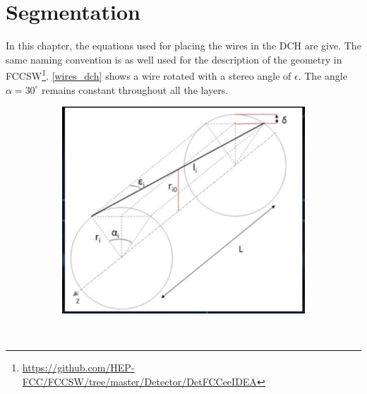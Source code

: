 \appendix
\section{Segmentation}\label{sec_segmentation_app}

In this chapter, the equations used for placing the wires in the DCH are give. The same naming convention is as well used for the description of the geometry in FCCSW\footnote{\href{https://github.com/HEP-FCC/FCCSW/tree/master/Detector/DetFCCeeIDEA}{https://github.com/HEP-FCC/FCCSW/tree/master/Detector/DetFCCeeIDEA}}. \cref{wires_dch} shows a wire rotated with a stereo angle of $\epsilon$. The angle $\alpha = 30^{\circ}$ remains constant throughout all the layers.


\begin{figure}[ht]
  \begin{subfigure}[b]{0.49\textwidth}
	   \centering
	   \includegraphics[width=\textwidth]{figures/wires_DCH.png}%
     \caption{}
     \label{fig_wire_3d}
  \end{subfigure}~
  \begin{subfigure}[b]{0.49\textwidth}
	   \centering
\end{subfigure}
\end{figure}
